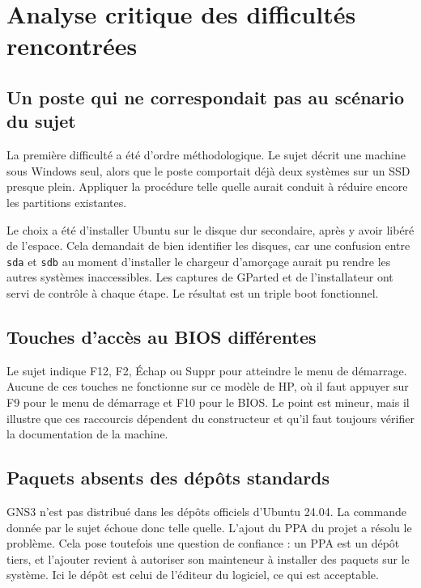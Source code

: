 \documentclass[11pt,a4paper]{article}
\begin{document}
\section{Analyse critique des difficult\'es rencontr\'ees}

\subsection{Un poste qui ne correspondait pas au sc\'enario du sujet}

La premi\`ere difficult\'e a \'et\'e d'ordre m\'ethodologique. Le sujet d\'ecrit une machine sous Windows
seul, alors que le poste comportait d\'ej\`a deux syst\`emes sur un SSD presque plein. Appliquer la
proc\'edure telle quelle aurait conduit \`a r\'eduire encore les partitions existantes.

Le choix a \'et\'e d'installer Ubuntu sur le disque dur secondaire, apr\`es y avoir lib\'er\'e de l'espace.
Cela demandait de bien identifier les disques, car une confusion entre \texttt{sda} et \texttt{sdb} au moment
d'installer le chargeur d'amor\c{c}age aurait pu rendre les autres syst\`emes inaccessibles. Les captures de
GParted et de l'installateur ont servi de contr\^ole \`a chaque \'etape. Le r\'esultat est un triple boot
fonctionnel.

\subsection{Touches d'acc\`es au BIOS diff\'erentes}

Le sujet indique F12, F2, \'Echap ou Suppr pour atteindre le menu de d\'emarrage. Aucune de ces touches ne
fonctionne sur ce mod\`ele de HP, o\`u il faut appuyer sur F9 pour le menu de d\'emarrage et F10 pour le
BIOS. Le point est mineur, mais il illustre que ces raccourcis d\'ependent du constructeur et qu'il faut
toujours v\'erifier la documentation de la machine.

\subsection{Paquets absents des d\'ep\^ots standards}

GNS3 n'est pas distribu\'e dans les d\'ep\^ots officiels d'Ubuntu 24.04. La commande donn\'ee par le sujet
\'echoue donc telle quelle. L'ajout du PPA du projet a r\'esolu le probl\`eme. Cela pose toutefois une
question de confiance : un PPA est un d\'ep\^ot tiers, et l'ajouter revient \`a autoriser son mainteneur \`a
installer des paquets sur le syst\`eme. Ici le d\'ep\^ot est celui de l'\'editeur du logiciel, ce qui est
acceptable.
\end{document}
